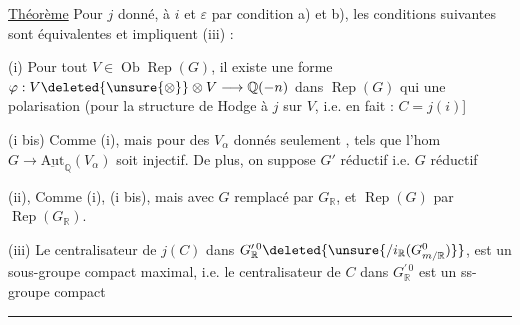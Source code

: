 \uline{Théorème} Pour $j$ donné,  à $i$ et $\varepsilon$ par condition a) et b), les conditions suivantes  sont équivalentes et impliquent (iii) :

(i) Pour tout $V\in\operatorname{Ob}\operatorname{Rep}(G)$,  il existe une forme $\varphi:V\deleted{\unsure{\otimes}}\otimes V\longrightarrow\mathbb{Q}(-n)$ dans $\operatorname{Rep}(G)$ qui  une polarisation (pour la structure de Hodge  à $j$ sur $V$, \unsure{$j$|$]$|$\}$} i.e. en fait : $C=j(i)$]

(i bis) Comme (i), mais  pour des $V_{\alpha}$ donnés seulement ,  tels que  l'hom $G\longrightarrow\underline{\mathrm{Aut}}_{\mathbb{Q}}(V_{\alpha})$ soit injectif. De plus, on suppose $G'$ réductif i.e. $G$ réductif

(ii),  Comme (i), (i bis), mais avec $G$ remplacé par $G_{\mathbb{R}}$, et $\operatorname{Rep}(G)$ par $\operatorname{Rep}(G_{\mathbb{R}})$.

(iii)  Le centralisateur de $j(C)$  dans $G_{\mathbb{R}}^{\prime\,0}\deleted{\unsure{/i_{\mathbb{R}}(G_{m/\mathbb{R}}^{0})}}$,  est un sous-groupe compact maximal,  i.e. le centralisateur de $C$ dans $G_{\mathbb{R}}^{\prime\,0}$ est un ss-groupe compact 


\noindent\rule{\linewidth}{0.3pt}


